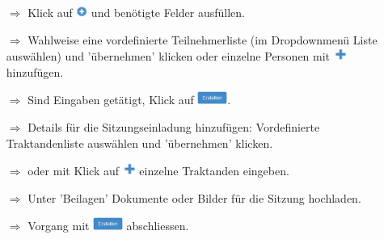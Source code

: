 \documentclass{article}
\begin{document}


\pagebreak


\vspace{\baselineskip}



\begin{multicols}{2}

\begin{tcolorbox}[colback=blue!5,colframe=blue!40!black,title=Zu einer neuen Sitzung einladen]
\begin{itemize}
  \item[$\Longrightarrow$] Klick auf \includegraphics[height=10pt]{Icons/Plussymbol.jpg} und benötigte Felder ausfüllen.
  \item[$\Longrightarrow$] Wahlweise eine vordefinierte Teilnehmerliste (im Dropdownmenü Liste auswählen) und 'übernehmen' klicken oder einzelne Personen mit \includegraphics[height=12pt]{Icons/Pluszeichen.jpg} hinzufügen.
  \item[$\Longrightarrow$] Sind Eingaben getätigt, Klick auf \includegraphics[height=12pt]{Icons/B_Erstellen.jpg}. 
	\item[$\Longrightarrow$] Details für die Sitzungseinladung hinzufügen: Vordefinierte Traktandenliste auswählen und 'übernehmen' klicken.
  \item[$\Longrightarrow$] oder mit Klick auf \includegraphics[height=12pt]{Icons/Pluszeichen.jpg}  einzelne Traktanden eingeben.
  \item[$\Longrightarrow$] Unter 'Beilagen' Dokumente oder Bilder für die Sitzung hochladen.						
	\item[$\Longrightarrow$] Vorgang mit \includegraphics[height=12pt]{Icons/B_Erstellen.jpg} abschliessen.
\end{itemize}
\end{tcolorbox}



\end{multicols}
\end{document}
